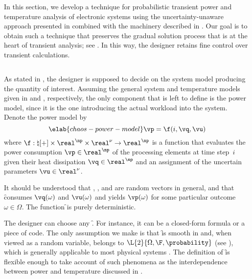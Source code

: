 In this section, we develop a technique for probabilistic transient power and
temperature analysis of electronic systems using the uncertainty-unaware
approach presented in  combined with the machinery
described in . Our goal is to obtain such a
technique that preserves the gradual solution process that is at the heart of
transient analysis; see . In this way, the designer
retains fine control over transient calculations.

\subsection{\problemtitle}

As stated in , the designer is supposed to
decide on the system model producing the quantity of interest. Assuming the
general system and temperature models given in  and
, respectively, the only component that is left to
define is the power model, since it is the one introducing the actual workload
into the system. Denote the power model by
\begin{equation} \elab{chaos-power-model}
  \vp = \f(i, \vq, \vu)
\end{equation}
where $\f: \natural[+] \times \real^\np \times \real^\nu \to \real^\np$ is a
function that evaluates the power consumption $\vp \in \real^\np$ of the
processing elements at time step~$i$ given their heat dissipation $\vq \in
\real^\np$ and an assignment of the uncertain parameters $\vu \in \real^\nu$.

\begin{remark}
It should be understood that \vp, \vq, and \vu are random vectors in general,
and that \f consumes $\vq(\omega)$ and $\vu(\omega)$ and yields $\vp(\omega)$
for some particular outcome $\omega \in \Omega$. The function \f \perse is
purely deterministic.
\end{remark}

The designer can choose any \f. For instance, it can be a closed-form formula or
a piece of code. The only assumption we make is that \f is smooth in \vz and,
when viewed as a random variable, belongs to $\L{2}{\Omega, \F, \probability}$
(see ), which is generally applicable to most physical
systems \cite{xiu2010}. The definition of \f is flexible enough to take account
of such phenomena as the interdependence between power and temperature discussed
in .

